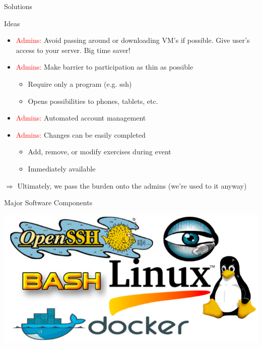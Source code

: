 \documentclass[xcolor=svgnames,handout]{beamer}
\begin{document}
\begin{frame}{Solutions}
  \begin{block}{Ideas}
    \begin{itemize}
      \item \textcolor{red}{Admins:} Avoid passing around or downloading VM’s if possible. Give user’s access to your server. Big time saver!
      \item \textcolor{red}{Admins:} Make barrier to participation as thin as possible
    	\begin{itemize}
		\item Require only a program (e.g. ssh)
		\item Opens possibilities to phones, tablets, etc.
    	\end{itemize}
      \item \textcolor{red}{Admins:} Automated account management
      \item \textcolor{red}{Admins:} Changes can be easily completed
    	\begin{itemize}
		\item Add, remove, or modify exercises during event
		\item Immediately available
    	\end{itemize}
    \end{itemize}
  \end{block}
 \begin{center}
    \item[$\Rightarrow$]
      \alert{Ultimately, we pass the burden onto the admins (we’re used to it anyway)}
  \end{center}
\end{frame}

\begin{frame}{Major Software Components}
  \begin{center}
    \includegraphics[width=.8\textheight]{components.png}
  \end{center}
  \begin{center}
  \end{center}
\end{frame}
\end{document}
